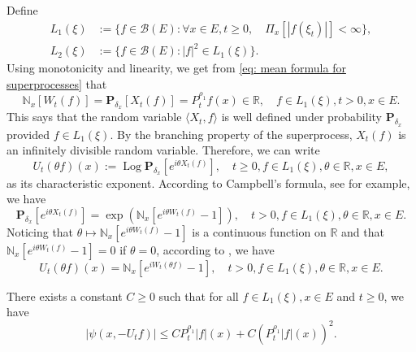 \documentclass[EJP]{ejpecp} %
\begin{document}
	Define
\begin{align}
	L_1(\xi)
	&:= \{f\in \mathcal B(E): \forall x\in E, t\geq 0, \quad \Pi_x[|f(\xi_t)|]< \infty\}, \\
	L_2(\xi)
	&:= \{f \in \mathcal B(E): |f|^2 \in L_1(\xi)\}.
\end{align}
	Using monotonicity and linearity, we get from \eqref{eq: mean formula for superprocesses}  that
\[
	\mathbb N_x[W_t(f)]
	= \mathbf P_{\delta_x}[X_t(f)]
	= P^{\rho_1}_t f(x) \in \mathbb R,
	\quad f\in L_1(\xi), t > 0,x\in E.
\]
	This says that the random variable $\langle X_t, f\rangle$ is well defined under probability $\mathbf P_{\delta_x}$ provided $f\in L_1(\xi)$.
	By the branching property of the superprocess, $X_t(f)$ is an infinitely divisible random variable.
	Therefore, we can write
\[
	U_t(\theta f)(x)
	:= \operatorname{Log} \mathbf P_{\delta_x}[e^{i \theta X_t( f)}],
	\quad t\geq 0, f\in L_1(\xi), \theta \in \mathbb R, x\in E,
\]
	as its characteristic exponent.
	According to Campbell's formula, see \cite[Theorem 2.7]{Kyprianou2014Fluctuations} for example, we have
\[
	\mathbf P_{\delta_x} [e^{i\theta X_t(f)}]
	= \exp(\mathbb N_x[ e^{i\theta W_t(f)} - 1]),
	\quad t>0, f\in L_1(\xi), \theta \in \mathbb R, x\in E.
\]
	Noticing that $\theta \mapsto \mathbb N_x[e^{i\theta W_t(f)} - 1]$ is a continuous function on $\mathbb R$ and that $\mathbb N_x[e^{i\theta W_t(f)} - 1] = 0$ if $\theta = 0$, according to \cite[Lemma 7.6]{Sato2013Levy}, we have
\begin{equation}
\label{eq: N and characteristic exponent}
	U_t(\theta f)(x)
	= \mathbb N_x[e^{i W_t(\theta f)} - 1],	
	\quad t>0, f\in L_1(\xi), \theta \in \mathbb R, x\in E.
\end{equation}

\begin{lemma}
	There exists a constant $C\geq 0$ such that for all $f \in L_1(\xi),x\in E$ and $t\geq 0$, we have
\begin{equation}
	\label{eq: upper bound of psi(v)}
    |\psi (x,-U_tf)|
    \leq C P^{\rho_1}_t |f|(x) + C (P^{\rho_1}_t |f| (x))^2.
\end{equation}
\end{lemma}
\end{document}
